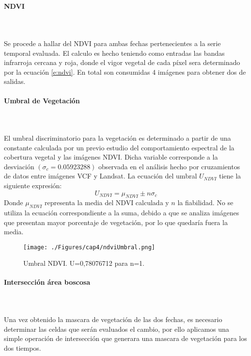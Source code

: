 \paragraph{NDVI}\mbox{}\\\mbox{}\\
Se procede a hallar del NDVI para ambas fechas pertenecientes a la serie temporal evaluada. El calculo es hecho teniendo como entradas las bandas infrarroja cercana y roja, donde el vigor vegetal de cada p\'ixel sera determinado por la ecuaci\'on \ref{e:ndvi}. En total son consumidas 4 im\'agenes para obtener dos de salidas.
\paragraph{Umbral de Vegetaci\'on}\label{sec:uvegetacion}\mbox{}\\\mbox{}\\
El umbral discriminatorio para la vegetaci\'on es determinado a partir de una constante calculada por un previo estudio del comportamiento espectral de la cobertura vegetal y las im\'agenes NDVI. Dicha variable corresponde a la desviaci\'on $(\sigma_{c} = 0.05923288)  $ observada en el an\'alisis hecho por cruzamientos de datos entre im\'agenes VCF y Landsat. La ecuaci\'on del umbral $ U_{NDVI} $ tiene la siguiente expresi\'on:
		\begin{equation}
		U_{NDVI} = \mu_{NDVI}\pm n \sigma_{c}
		\end{equation}
Donde $ \mu_{NDVI} $ representa la media del NDVI calculada y $ n $ la fiabilidad. No se utiliza la ecuaci\'on correspondiente a la suma, debido a que se analiza im\'agenes que presentan mayor porcentaje de vegetaci\'on, por lo que quedaría fuera la media.
\begin{figure}[H]
	\centering
	\texttt{[image: ./Figures/cap4/ndviUmbral.png]}
	\caption{Umbral NDVI. U=0,78076712 para n=1.}
	\label{fig:ndviUmbral}
\end{figure}

\paragraph{Intersecci\'on \'area boscosa }\mbox{}\\\mbox{}\\
Una vez obtenido la mascara de vegetaci\'on de las dos fechas, es necesario determinar las celdas que ser\'an evaluados el cambio, por ello aplicamos una simple operaci\'on de intersecci\'on que generara una mascara de vegetaci\'on para los dos tiempos.

